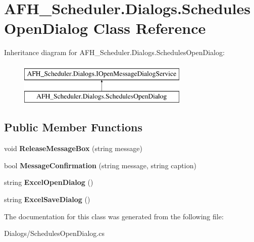 \section{A\+F\+H\+\_\+\+Scheduler.\+Dialogs.\+Schedules\+Open\+Dialog Class Reference}
\label{class_a_f_h___scheduler_1_1_dialogs_1_1_schedules_open_dialog}
Inheritance diagram for A\+F\+H\+\_\+\+Scheduler.\+Dialogs.\+Schedules\+Open\+Dialog\+:\begin{figure}[H]
\begin{center}
\leavevmode
\includegraphics[height=2.000000cm]{class_a_f_h___scheduler_1_1_dialogs_1_1_schedules_open_dialog}
\end{center}
\end{figure}
\subsection*{Public Member Functions}
\begin{DoxyCompactItemize}
\item 
\mbox{\label{class_a_f_h___scheduler_1_1_dialogs_1_1_schedules_open_dialog_a5bc0810c1c83579300c3763748517a75}} 
void {\bfseries Release\+Message\+Box} (string message)
\item 
\mbox{\label{class_a_f_h___scheduler_1_1_dialogs_1_1_schedules_open_dialog_a81e564c9710af5c13a4e74bc3a4c8c7e}} 
bool {\bfseries Message\+Confirmation} (string message, string caption)
\item 
\mbox{\label{class_a_f_h___scheduler_1_1_dialogs_1_1_schedules_open_dialog_ad22411ab7707cfe837ded768853d0170}} 
string {\bfseries Excel\+Open\+Dialog} ()
\item 
\mbox{\label{class_a_f_h___scheduler_1_1_dialogs_1_1_schedules_open_dialog_a787f5061632cf5d5d59bce53a2710b88}} 
string {\bfseries Excel\+Save\+Dialog} ()
\end{DoxyCompactItemize}


The documentation for this class was generated from the following file\+:\begin{DoxyCompactItemize}
\item 
Dialogs/Schedules\+Open\+Dialog.\+cs\end{DoxyCompactItemize}
